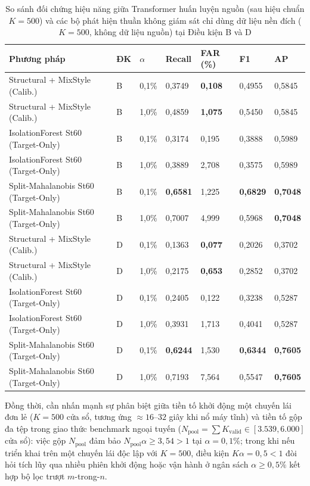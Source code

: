 \documentclass[12pt, a4paper, reqno, oneside]{book}
\begin{document}
{\renewcommand{\arraystretch}{0.85}
\begin{table}[htbp]\centering\footnotesize
\caption[So sánh đối chứng Transformer nguồn và bộ phát hiện thuần xe đích]{So sánh đối chứng hiệu năng giữa Transformer huấn luyện nguồn (sau hiệu chuẩn $K=500$) và các bộ phát hiện thuần không giám sát chỉ dùng dữ liệu nền đích ($K=500$, không dữ liệu nguồn) tại Điều kiện B và D}\label{tab:target-only-summary}
\begin{tabular}{P{4.4cm}P{0.8cm}P{1.0cm}P{1.6cm}P{1.8cm}P{1.6cm}P{1.6cm}}
\toprule
Phương pháp & ĐK & $\alpha$ & Recall & FAR (\%) & F1 & AP \\ \midrule
Structural + MixStyle (Calib.) & B & 0,1\% & 0,3749 & \textbf{0,108} & 0,4955 & 0,5845 \\
Structural + MixStyle (Calib.) & B & 1,0\% & 0,4859 & \textbf{1{,}075} & 0,5450 & 0,5845 \\
IsolationForest St60 (Target-Only) & B & 0,1\% & 0,3174 & 0,195 & 0,3888 & 0,5989 \\
IsolationForest St60 (Target-Only) & B & 1,0\% & 0,3889 & 2{,}708 & 0,3575 & 0,5989 \\
Split-Mahalanobis St60 (Target-Only)& B & 0,1\% & \textbf{0,6581} & 1{,}225 & \textbf{0,6829} & \textbf{0,7048} \\
Split-Mahalanobis St60 (Target-Only)& B & 1,0\% & 0,7007 & 4{,}999 & 0,5968 & \textbf{0,7048} \\
\midrule
Structural + MixStyle (Calib.) & D & 0,1\% & 0,1363 & \textbf{0,077} & 0,2026 & 0,3702 \\
Structural + MixStyle (Calib.) & D & 1,0\% & 0,2175 & \textbf{0,653} & 0,2852 & 0,3702 \\
IsolationForest St60 (Target-Only) & D & 0,1\% & 0,2405 & 0,122 & 0,3238 & 0,5287 \\
IsolationForest St60 (Target-Only) & D & 1,0\% & 0,3931 & 1{,}713 & 0,4041 & 0,5287 \\
Split-Mahalanobis St60 (Target-Only)& D & 0,1\% & \textbf{0,6244} & 1{,}530 & \textbf{0,6344} & \textbf{0,7605} \\
Split-Mahalanobis St60 (Target-Only)& D & 1,0\% & 0,7193 & 7{,}564 & 0,5547 & \textbf{0,7605} \\
\bottomrule
\end{tabular}
\end{table}}
Đồng thời, cần nhấn mạnh sự phân biệt giữa tiền tố khởi động một chuyến lái đơn lẻ ($K=500$ cửa sổ, tương ứng $\approx 16\text{--}32$ giây khi nổ máy tĩnh) và tiền tố gộp đa tệp trong giao thức benchmark ngoại tuyến ($N_{\text{pool}} = \sum K_{\text{valid}} \in [3.539, 6.000]$ cửa sổ): việc gộp $N_{\text{pool}}$ đảm bảo $N_{\text{pool}}\alpha \ge 3{,}54 > 1$ tại $\alpha=0{,}1\%$; trong khi nếu triển khai trên một chuyến lái độc lập với $K=500$, điều kiện $K\alpha = 0{,}5 < 1$ đòi hỏi tích lũy qua nhiều phiên khởi động hoặc vận hành ở ngân sách $\alpha \ge 0{,}5\%$ kết hợp bộ lọc trượt $m$-trong-$n$.
\end{document}
